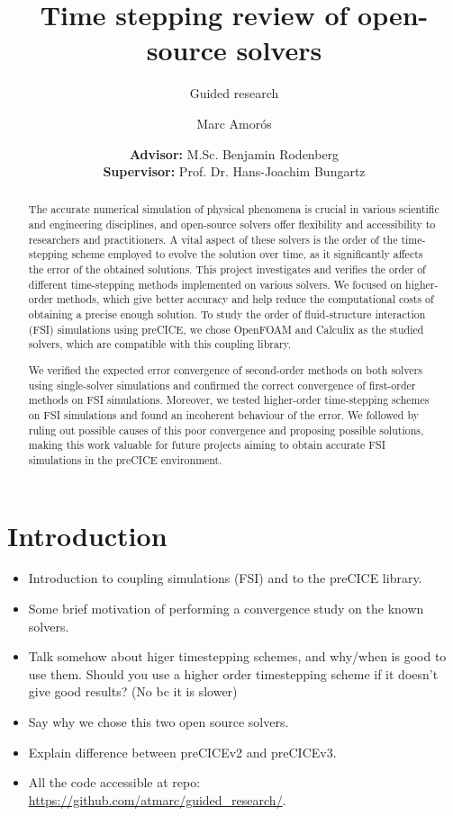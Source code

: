 \documentclass[
  english,        %
  font=times,     %
  onecolumn,      %
]{tumarticle}
\title{Time stepping review of open-source solvers}
\subtitle{Guided research}
\author[email=marc.amoros@tum.de]{Marc Amorós}
\date{
    \small
    \textbf{Advisor:} M.Sc. Benjamin Rodenberg \\
    \textbf{Supervisor:} Prof. Dr. Hans-Joachim Bungartz \\
}
\begin{document}
\maketitle

\begin{abstract}
    The accurate numerical simulation of physical phenomena is crucial in various scientific and engineering disciplines, and open-source solvers offer flexibility and accessibility to researchers and practitioners. A vital aspect of these solvers is the order of the time-stepping scheme employed to evolve the solution over time, as it significantly affects the error of the obtained solutions. This project investigates and verifies the order of different time-stepping methods implemented on various solvers. We focused on higher-order methods, which give better accuracy and help reduce the computational costs of obtaining a precise enough solution. To study the order of fluid-structure interaction (FSI) simulations using preCICE, we chose OpenFOAM and Calculix as the studied solvers, which are compatible with this coupling library. 

    We verified the expected error convergence of second-order methods on both solvers using single-solver simulations and confirmed the correct convergence of first-order methods on FSI simulations. Moreover, we tested higher-order time-stepping schemes on FSI simulations and found an incoherent behaviour of the error. We followed by ruling out possible causes of this poor convergence and proposing possible solutions, making this work valuable for future projects aiming to obtain accurate FSI simulations in the preCICE environment.
\end{abstract}

\section{Introduction}
\begin{itemize}
    \item Introduction to coupling simulations (FSI) and to the preCICE library. 
    \item Some brief motivation of performing a convergence study on the known solvers.
    \item Talk somehow about higer timestepping schemes, and why/when is good to use them. Should you use a higher order timestepping scheme if it doesn't give good results? (No bc it is slower) 
    \item Say why we chose this two open source solvers.
    \item Explain difference between preCICEv2 and preCICEv3.
    \item All the code accessible at repo: \url{https://github.com/atmarc/guided_research/}.
\end{itemize}
\end{document}
